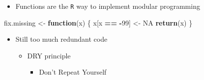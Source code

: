 \documentclass[ignorenonframetext,]{beamer}
\newenvironment{Shaded}{\begin{snugshade}}{\end{snugshade}}
\newcommand{\KeywordTok}[1]{\textcolor[rgb]{0.13,0.29,0.53}{\textbf{#1}}}
\newcommand{\DecValTok}[1]{\textcolor[rgb]{0.00,0.00,0.81}{#1}}
\newcommand{\StringTok}[1]{\textcolor[rgb]{0.31,0.60,0.02}{#1}}
\newcommand{\OtherTok}[1]{\textcolor[rgb]{0.56,0.35,0.01}{#1}}
\newcommand{\ControlFlowTok}[1]{\textcolor[rgb]{0.13,0.29,0.53}{\textbf{#1}}}
\newcommand{\OperatorTok}[1]{\textcolor[rgb]{0.81,0.36,0.00}{\textbf{#1}}}
\newcommand{\NormalTok}[1]{#1}
\providecommand{\tightlist}{%
  \setlength{\itemsep}{0pt}\setlength{\parskip}{0pt}}
\begin{document}
\begin{frame}[fragile]

\begin{itemize}[<+->]
\tightlist
\item
  Functions are the \texttt{R} way to implement modular programming
\end{itemize}

\begin{Shaded}
\begin{Highlighting}[]
\NormalTok{fix.missing <-}\StringTok{ }\ControlFlowTok{function}\NormalTok{(x) \{}
\NormalTok{  x[x }\OperatorTok{==}\StringTok{ }\OperatorTok{-}\DecValTok{99}\NormalTok{] <-}\StringTok{ }\OtherTok{NA}
  \KeywordTok{return}\NormalTok{(x)}
\NormalTok{\}}
\end{Highlighting}
\end{Shaded}

\begin{Shaded}
\end{Shaded}

\begin{itemize}[<+->]
\tightlist
\item
  Still too much redundant code

  \begin{itemize}[<+->]
  \tightlist
  \item
    DRY principle

    \begin{itemize}[<+->]
    \tightlist
    \item
      Don't Repeat Yourself
    \end{itemize}
  \end{itemize}
\end{itemize}

\end{frame}
\end{document}

